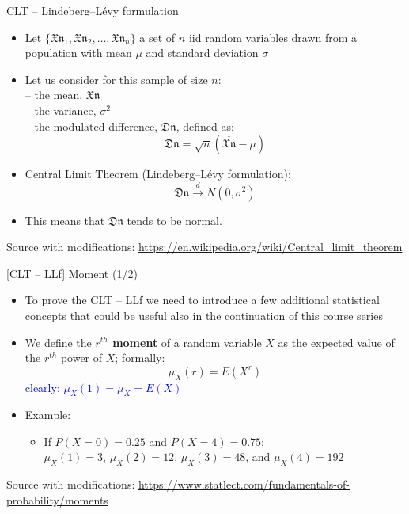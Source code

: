 \documentclass{beamer}
\begin{document}
\begin{frame}
{\centerline{CLT -- Lindeberg–L\'{e}vy formulation}}


\begin{itemize}
\item Let $\{ \mathfrak{Xn}_1, \mathfrak{Xn}_2, \ldots{}, \mathfrak{Xn}_n\}$ a set of $n$ iid random variables drawn from a population with mean $\mu$ and standard deviation $\sigma$
\item Let us consider for this sample of size $n$:\\
-- the mean, $\overline{\mathfrak{Xn}}$\\
-- the variance, $\sigma^2$\\
-- the modulated difference, $\mathfrak{Dn}$, defined as:
$$\mathfrak{Dn} = \sqrt{n}(\overline{\mathfrak{Xn}}-\mu)$$

\item Central Limit Theorem (Lindeberg–L\'{e}vy formulation):
$$\mathfrak{Dn} \xrightarrow{d} N(0,\sigma^2)$$

\item This means that $\mathfrak{Dn}$ tends to be normal.

\end{itemize}

\begin{center}
\tiny 
Source with modifications: \url{https://en.wikipedia.org/wiki/Central_limit_theorem}
\end{center}
\end{frame}


\begin{frame}
{\centerline{[CLT -- LLf] Moment (1/2)}}


\begin{itemize}
\item To prove the CLT -- LLf we need to introduce a few additional statistical concepts that could be useful also in the continuation of this course series
\item We define the \textbf{$r^{th}$ moment} of a random variable $X$ as the expected value of the $r^{th}$ power of $X$; formally:
$$ \mu_X(r) = E(X^r)$$
\textcolor{blue}{clearly: $ \mu_X(1) = \mu_X = E(X)$}
\item Example:
\begin{itemize}
\item If $P(X=0) = 0.25$ and $P(X=4) = 0.75$:\\
$\mu_X(1) = 3$, 
$\mu_X(2) = 12$, 
$\mu_X(3) = 48$, and 
$\mu_X(4) = 192$
\end{itemize}

\end{itemize}

\begin{center}
\tiny 
Source with modifications: \url{https://www.statlect.com/fundamentals-of-probability/moments}
\end{center}

\end{frame}
\end{document}
